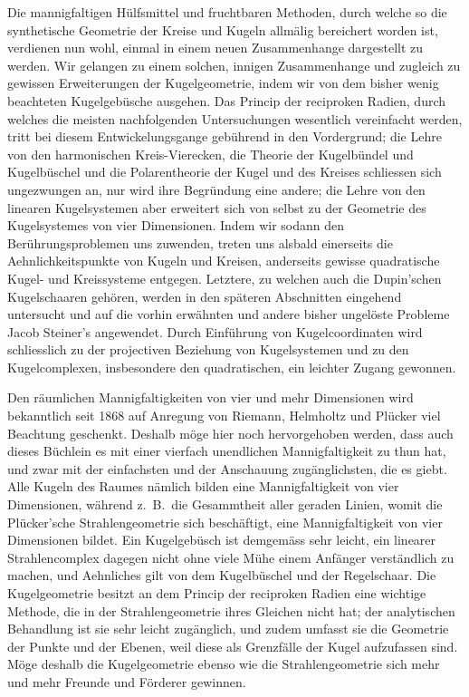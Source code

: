 Die mannigfaltigen H\"ulfsmittel und fruchtbaren Methoden,
durch welche so die synthetische Geometrie der Kreise
und Kugeln allm\"alig bereichert worden ist, verdienen nun
wohl, einmal in einem neuen Zusammenhange dargestellt zu
werden. Wir gelangen zu einem solchen, innigen Zusammenhange
und zugleich zu gewissen Erweiterungen der Kugelgeometrie,
indem wir von dem bisher wenig beachteten
Kugelgeb\"usche ausgehen. Das Princip der reciproken Radien,
durch welches die meisten nachfolgenden Untersuchungen
wesentlich vereinfacht werden, tritt bei diesem Entwickelungsgange
geb\"uhrend in den Vordergrund; die Lehre von den
harmonischen Kreis-Vierecken, die Theorie der Kugelb\"undel
und Kugelb\"uschel und die Polarentheorie der Kugel und des
Kreises schliessen sich ungezwungen an, nur wird ihre Begr\"undung
eine andere; die Lehre von den linearen Kugelsystemen
aber erweitert sich von selbst zu der Geometrie des Kugelsystemes
von vier Dimensionen. Indem wir sodann den
Ber\"uhrungsproblemen uns zuwenden, treten uns alsbald
einerseits die Aehnlichkeitspunkte von Kugeln und Kreisen,
anderseits gewisse quadratische Kugel- und Kreissysteme
entgegen. Letztere, zu welchen auch die Dupin'schen Kugelschaaren
geh\"oren, werden in den sp\"ateren Abschnitten eingehend
untersucht und auf die vorhin erw\"ahnten und andere
bisher ungel\"oste Probleme Jacob Steiner's angewendet. Durch
Einf\"uhrung von Kugelcoordinaten wird schliesslich zu der
projectiven Beziehung von Kugelsystemen und zu den Kugelcomplexen,
insbesondere den quadratischen, ein leichter Zugang
gewonnen.

Den r\"aumlichen Mannigfaltigkeiten von vier und mehr
Dimensionen wird bekanntlich seit 1868 auf Anregung von
Riemann, Helmholtz und Pl\"ucker viel Beachtung geschenkt.
Deshalb m\"oge hier noch hervorgehoben werden, dass auch
dieses B\"uchlein es mit einer vierfach unendlichen Mannigfaltigkeit
zu thun hat, und zwar mit der einfachsten und
der Anschauung zug\"ang\-lich\-sten, die es giebt. Alle Kugeln
des Raumes n\"amlich bilden eine  Mannigfaltigkeit
von vier Dimensionen, w\"ahrend z.~B.\ die Gesammtheit aller
geraden Linien, womit die Pl\"ucker'sche Strahlengeometrie
sich besch\"aftigt, eine  Mannigfaltigkeit von vier
Dimensionen bildet. Ein Kugelgeb\"usch ist demgem\"ass sehr
leicht, ein linearer Strahlencomplex dagegen nicht ohne viele
M\"uhe einem Anf\"anger verst\"andlich zu machen, und Aehnliches
gilt von dem Kugelb\"uschel und der Regelschaar. Die Kugelgeometrie
besitzt an dem Princip der reciproken Radien eine
wichtige Methode, die in der Strahlengeometrie ihres Gleichen
nicht hat; der analytischen Behandlung ist sie sehr leicht zug\"anglich,
und zudem umfasst sie die Geometrie der Punkte
und der Ebenen, weil diese als Grenzf\"alle der Kugel aufzufassen
sind. M\"oge deshalb die Kugelgeometrie ebenso wie
die Strahlengeometrie sich mehr und mehr Freunde und
F\"orderer gewinnen.
\bigskip

